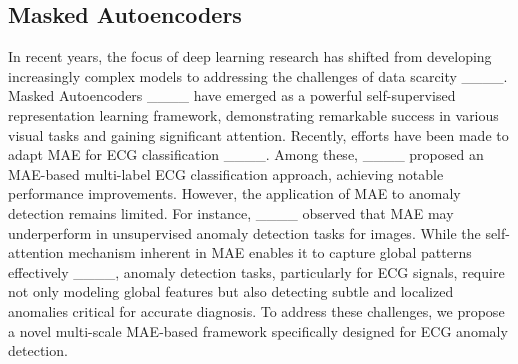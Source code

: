 \subsection{Masked Autoencoders}
In recent years, the focus of deep learning research has shifted from developing increasingly complex models to addressing the challenges of data scarcity ____. Masked Autoencoders ____ have emerged as a powerful self-supervised representation learning framework, demonstrating remarkable success in various visual tasks and gaining significant attention. Recently, efforts have been made to adapt MAE for ECG classification ____. Among these, ____ proposed an MAE-based multi-label ECG classification approach, achieving notable performance improvements. However, the application of MAE to anomaly detection remains limited. For instance,  ____ observed that MAE may underperform in unsupervised anomaly detection tasks for images. While the self-attention mechanism inherent in MAE enables it to capture global patterns effectively ____, anomaly detection tasks, particularly for ECG signals, require not only modeling global features but also detecting subtle and localized anomalies critical for accurate diagnosis. To address these challenges, we propose a novel multi-scale MAE-based framework specifically designed for ECG anomaly detection.
